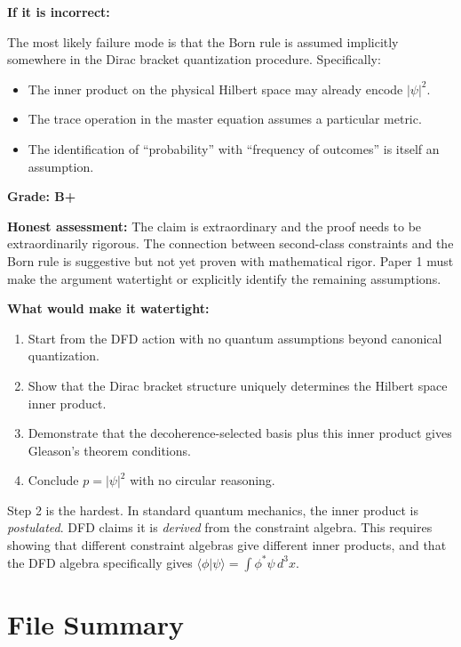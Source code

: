 \documentclass[11pt,a4paper]{article}
\begin{document}
\textbf{If it is incorrect:}

The most likely failure mode is that the Born rule is assumed implicitly somewhere in the Dirac bracket quantization procedure. Specifically:
\begin{itemize}
\item The inner product on the physical Hilbert space may already encode $|\psi|^2$.
\item The trace operation in the master equation assumes a particular metric.
\item The identification of ``probability'' with ``frequency of outcomes'' is itself an assumption.
\end{itemize}

\textbf{Grade: B+}

\textbf{Honest assessment:} The claim is extraordinary and the proof needs to be extraordinarily rigorous. The connection between second-class constraints and the Born rule is suggestive but not yet proven with mathematical rigor. Paper 1 must make the argument watertight or explicitly identify the remaining assumptions.

\textbf{What would make it watertight:}
\begin{enumerate}
\item Start from the DFD action with no quantum assumptions beyond canonical quantization.
\item Show that the Dirac bracket structure uniquely determines the Hilbert space inner product.
\item Demonstrate that the decoherence-selected basis plus this inner product gives Gleason's theorem conditions.
\item Conclude $p = |\psi|^2$ with no circular reasoning.
\end{enumerate}

Step 2 is the hardest. In standard quantum mechanics, the inner product is \emph{postulated}. DFD claims it is \emph{derived} from the constraint algebra. This requires showing that different constraint algebras give different inner products, and that the DFD algebra specifically gives $\langle\phi|\psi\rangle = \int\phi^*\psi\,d^3x$.

\section{File Summary}
\label{sec:file_summary}
\end{document}
